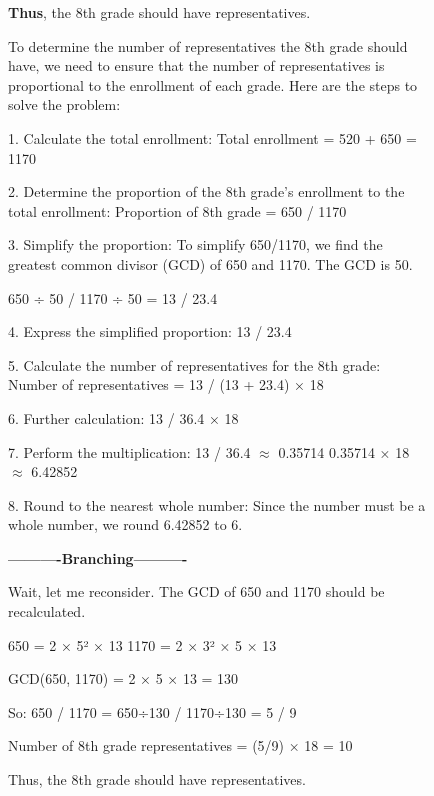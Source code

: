 \documentclass{llmxive}
\begin{document}
\begin{figure}[h]
\begin{minipage}[t]{0.48\linewidth}
\begin{tcolorbox}
\textbf{Thus}, the 8th grade should have  representatives.
\end{tcolorbox}
\end{minipage} 
\hspace*{\fill}
\begin{minipage}[t]{0.48\linewidth} 
    \begin{tcolorbox}[
        colback=gray!5!white, 
        colframe=blue!75!brown, 
        title=APPO Branching, 
        boxrule=0.3mm, 
        width=\linewidth,  
        arc=2mm, 
        height=18cm,
        auto outer arc=true,
        top=2mm, bottom=2mm, left=2mm, right=2mm 
    ]
To determine the number of representatives the 8th grade should have, we need 
to ensure that the number of representatives is proportional to the enrollment 
of each grade. Here are the steps to solve the problem:

1. Calculate the total enrollment:
   Total enrollment = 520 + 650 = 1170

2. Determine the proportion of the 8th grade's enrollment to the total enrollment:
   Proportion of 8th grade = 650 / 1170

3. Simplify the proportion:
   To simplify 650/1170, we find the greatest common divisor (GCD) of 650 and 
   1170. The GCD is 50.
   
   650 ÷ 50 / 1170 ÷ 50 = 13 / 23.4   

4. Express the simplified proportion:
   13 / 23.4

5. Calculate the number of representatives for the 8th grade:
   Number of representatives = 13 / (13 + 23.4) × 18

6. Further calculation:
   13 / 36.4 × 18

7. Perform the multiplication:
   13 / 36.4 $\approx$ 0.35714
   0.35714 × 18 $\approx$ 6.42852

8. Round to the nearest whole number:
   Since the number must be a whole number, we round 6.42852 to 6.

\textbf{----------Branching----------}

Wait, let me reconsider. The GCD of 650 and 1170 should be recalculated.

650 = 2 × 5² × 13
1170 = 2 × 3² × 5 × 13

GCD(650, 1170) = 2 × 5 × 13 = 130

So: 650 / 1170 = 650÷130 / 1170÷130 = 5 / 9

Number of 8th grade representatives = (5/9) × 18 = 10

Thus, the 8th grade should have  representatives.
\end{tcolorbox}
\end{minipage}

\end{figure}
\end{document}
